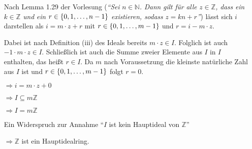 \documentclass{scrreprt}
\begin{document}
\noindent
Nach Lemma 1.29 der Vorlesung (\emph{``Sei $n \in \mathbb{N}$.
  Dann gilt für alle $z \in \mathbb{Z}$, dass ein
  $k \in \mathbb{Z}$ und ein $r \in \qty{0, 1, \ldots, n - 1}$
  existieren, sodass $z = kn + r$''})
lässt sich $i$ darstellen als $i = m \cdot z + r$ mit
$r \in \qty{0, 1, \ldots, m - 1}$ und $r = i - m \cdot z$.

Dabei ist nach Definition (iii) des Ideals bereits $m \cdot z \in I$.
Folglich ist auch $-1 \cdot m \cdot z \in I$.
Schließlich ist auch die Summe zweier Elemente aus $I$ in $I$ enthalten,
das heißt $r \in I$.
Da $m$ nach Voraussetzung die kleinste natürliche Zahl aus $I$ ist und
$r \in \qty{0, 1, \ldots, m - 1}$ folgt $r = 0$.

\noindent
$\Rightarrow i = m \cdot z + 0$

\noindent
$\Rightarrow I \subseteq m\mathbb{Z}$

\noindent
$\Rightarrow I = m\mathbb{Z}$

\noindent
Ein Widerspruch zur Annahme ``$I$ ist kein Hauptideal von $\mathbb{Z}$''

\noindent
$\Rightarrow \mathbb{Z}$ ist ein Hauptidealring.
\end{document}
